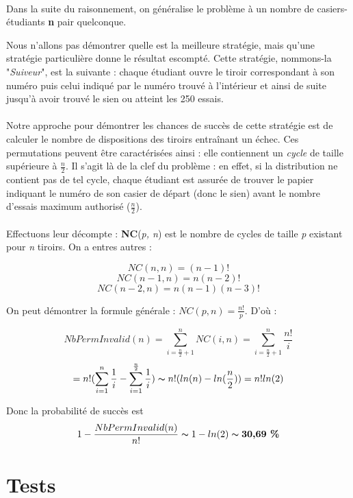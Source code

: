 \documentclass[a4paper,11pt]{article}
\begin{document}
	\paragraph {}
Dans la suite du raisonnement, on généralise le problème à un nombre de casiers-étudiants \textbf{n} pair quelconque.

Nous n'allons pas démontrer quelle est la meilleure stratégie, mais qu'une stratégie particulière donne le résultat escompté. Cette stratégie, nommons-la "\textit{Suiveur}", est la suivante : chaque étudiant ouvre le tiroir correspondant à son numéro puis celui indiqué par le numéro trouvé à l'intérieur et ainsi de suite jusqu'à avoir trouvé le sien ou atteint les 250 essais.

	\paragraph {}
Notre approche pour démontrer les chances de succès de cette stratégie est de calculer le nombre de dispositions des tiroirs entraînant un échec. Ces permutations peuvent être caractérisées ainsi : elle contiennent un \textit{cycle} de taille supérieure à $\frac{n}{2}$. Il s'agit là de la clef du problème : en effet, si la distribution ne contient pas de tel cycle, chaque étudiant est assurée de trouver le papier indiquant le numéro de son casier de départ (donc le sien) avant le nombre d'essais maximum authorisé ($\frac{n}{2}$).

	\paragraph {}
Effectuons leur décompte : \textbf{NC}(\textit{p, n}) est le nombre de cycles de taille \textit{p} existant pour \textit{n} tiroirs. On a entres autres :

$$ NC(n,n) = (n - 1)!$$
$$ NC(n-1,n) = n ( n - 2)!$$
$$ NC(n-2, n) = n (n - 1) (n - 3)!$$

On peut démontrer la formule générale : $NC(p,n) = \frac{n!}{p}$.
D'où :

$$ NbPermInvalid(n) = \sum^n_{i = \frac{n}{2} + 1} NC(i,n) = \sum^n_{i = \frac{n}{2} + 1} \frac{n!}{i}$$
$$= n! (\sum^n_{i = 1} \frac{1}{i} - \sum^\frac{n}{2}_{i = 1} \frac{1}{i}) \thicksim n! (ln(n) - ln(\frac{n}{2})) = n! ln(2)$$

Donc la probabilité de succès est
$$1 - \frac{NbPermInvalid(n)}{n!} \thicksim 1 - ln(2) \thicksim \textbf{30,69 \%}$$


\newpage
\section*{Tests}
\end{document}
